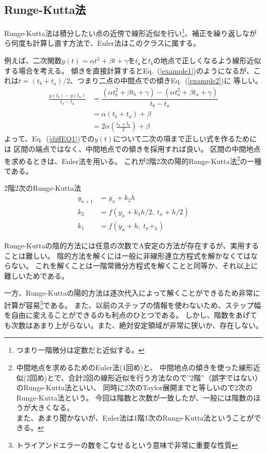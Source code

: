 \documentclass[autodetect-engine,dvipdfmx-if-dvi,ja=standard,a4paper,layout=v2]{bxjsreport}
\newcommand{\eref}[1]{Eq.~(\ref{#1})}
\begin{document}
    \subsection{Runge-Kutta法}
    Runge-Kutta法は積分したい点の近傍で線形近似を行い\footnote{
      つまり一階微分は定数だと近似する。
    }、補正を繰り返しながら何度も計算し直す方法で、Euler法はこのクラスに属する。\par
    例えば、二次関数$y(t) = \alpha t^2+\beta t+\gamma$を$t_a$と$t_b$の地点で正しくなるよう線形近似する場合を考える。
    傾きを直接計算すると\eref{example1}のようになるが、これは$t=(t_b+t_a)/2$、つまり二点の中間点での傾き\eref{example2}に
    等しい。
    \begin{align}
      \frac{y(t_b)-y(t_a)}{t_b-t_a}&=\dfrac{(\alpha t_b^2+\beta t_b+\gamma)-(\alpha t^2_a+\beta t_a+\gamma)}{t_b-t_a} \nonumber \\
      &=\alpha (t_b+t_a) + \beta\label{example1}\\
      &=2\alpha\left(\frac{t_a + t_b}{2}\right) + \beta \label{example2}
    \end{align}
    よって、\eref{diffEQ1}での$y(t)$について二次の項まで正しい式を作るためには
    区間の端点ではなく、中間地点での傾きを採用すれば良い。
    区間の中間地点を求めるときは、Euler法を用いる。
    これが2階2次の陽的Runge-Kutta法\footnote{
      中間地点を求めるためのEuler法(1回め)と、
      中間地点の傾きを使った線形近似(2回め)とで、合計2回の線形近似を行う方法なので”2階”（誤字ではない）のRunge-Kutta法といい、
      同時に2次のTaylor展開までと等しいので2次のRunge-Kutta法という。
      今回は階数と次数が一致したが、一般には階数のほうが大きくなる。\\
      また、あまり聞かないが、Euler法は1階1次のRunge-Kutta法ということができる。
    }の一種である。\par
    \begin{itembox}[l]{2階2次のRunge-Kutta法}
      \begin{align}
        y_{n+1}&=y_n + k_2h\\
        k_2&=f(y_n+k_1h/2,\:t_n+h/2)\\
        k_1&=f(y_n+h,\:t_n+_h)
      \end{align}
    \end{itembox}
    Runge-Kuttaの陰的方法には任意の次数でA安定の方法が存在するが、実用することは難しい。
    陰的方法を解くには一般に非線形連立方程式を解かなくてはならない。
    これを解くことは一階常微分方程式を解くことと同等か、それ以上に難しいためである。\par
    一方、Runge-Kuttaの陽的方法は逐次代入によって解くことができるため非常に計算が容易\footnote{
      トライアンドエラーの数をこなせるという意味で非常に重要な性質
    }である。
    また、以前のステップの情報を使わないため、ステップ幅を自由に変えることができるのも利点のひとつである。
    しかし、階数をあげても次数はあまり上がらない。また、絶対安定領域が非常に狭いか、存在しない。\par
\end{document}

